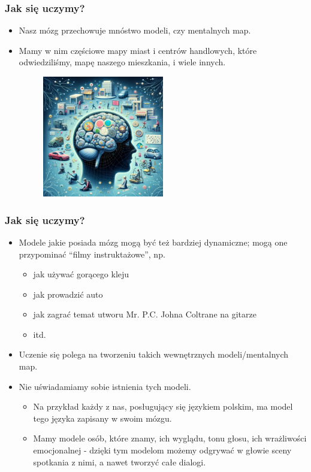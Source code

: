 \documentclass{beamer}
\begin{document}
\begin{frame}[fragile]
\frametitle{Jak się uczymy?}
\begin{itemize}
\item Nasz mózg przechowuje mnóstwo modeli, czy mentalnych map.
\item Mamy w nim częściowe mapy miast i centrów handlowych, które odwiedziliśmy, mapę naszego mieszkania, i wiele innych. 

                    \begin{figure}[h]
                        \centering
                        \includegraphics[width=0.5\textwidth]{../../img/mental_maps.png}
                    \end{figure}                    
                    \end{itemize}
\end{frame}

\begin{frame}[fragile]
\frametitle{Jak się uczymy?}
\begin{itemize}
\item Modele jakie posiada mózg mogą być też bardziej dynamiczne; mogą one przypominać “filmy instruktażowe”, np.
	\begin{itemize}
	\item jak używać gorącego kleju
	\item jak prowadzić auto
	\item jak zagrać temat utworu Mr. P.C. Johna Coltrane na gitarze
	\item itd.
	\end{itemize}
\item Uczenie się polega na tworzeniu takich wewnętrznych modeli/mentalnych map. 
\item Nie uświadamiamy sobie istnienia tych modeli. 
	\begin{itemize}
	\item Na przykład każdy z nas, posługujący się językiem polskim, ma model tego języka zapisany w swoim mózgu.
	\item Mamy modele osób, które znamy, ich wyglądu, tonu głosu, ich wrażliwości emocjonalnej - dzięki tym modelom możemy odgrywać w głowie sceny spotkania z nimi, a nawet tworzyć całe dialogi.
	\end{itemize}
\end{itemize}
\end{frame}
\end{document}
